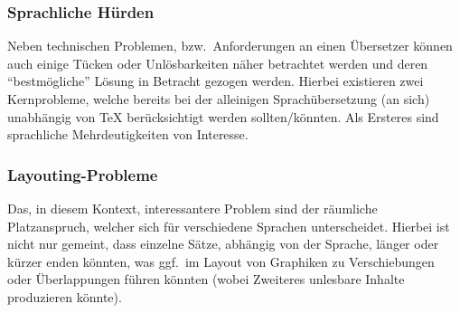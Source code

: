 \subsubsection{Sprachliche Hürden}
Neben technischen Problemen, bzw.\ Anforderungen an einen Übersetzer können auch einige Tücken oder Unlösbarkeiten näher betrachtet werden und deren \enquote{bestmögliche} Lösung in Betracht gezogen werden. Hierbei existieren zwei Kernprobleme, welche bereits bei der alleinigen Sprachübersetzung (an sich) unabhängig von \TeX{} berücksichtigt werden sollten/könnten. Als Ersteres sind sprachliche Mehrdeutigkeiten von Interesse. 

\subsubsection{Layouting-Probleme}
Das, in diesem Kontext, interessantere Problem sind der räumliche Platzanspruch, welcher sich für verschiedene Sprachen unterscheidet. Hierbei ist nicht nur gemeint, dass einzelne Sätze, abhängig von der Sprache, länger oder kürzer enden könnten, was ggf.\ im Layout von Graphiken zu Verschiebungen oder Überlappungen führen könnten (wobei Zweiteres unlesbare Inhalte produzieren könnte). 



